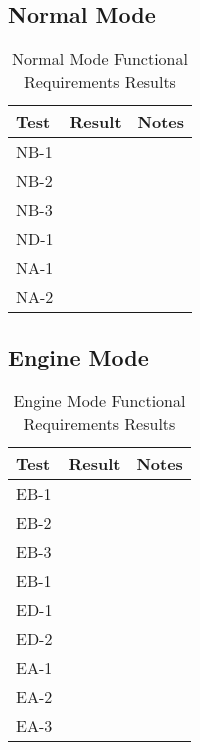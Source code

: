 \documentclass[12pt, titlepage]{article}
\begin{document}
\subsection{Normal Mode}

\begin{table}[H]
  \centering
      \setlength{\leftmargini}{0.4cm}
      \begin{tabular}{| >{\centering\arraybackslash}m{3cm} | 
        >{\centering\arraybackslash}m{4cm} | 
        >{\centering\arraybackslash}m{6cm} |}
      \hline
      \rowcolor[gray]{0.9}
      Test & Result & Notes\\
      \hline
      NB-1 &  & \\
      \hline
      NB-2 &  & \\
      \hline
      NB-3 &  & \\
      \hline
      ND-1 &  & \\
      \hline
      NA-1 &  & \\
      \hline
      NA-2 &  & \\
      \hline
      \end{tabular}
  \caption{Normal Mode Functional Requirements Results}
  \end{table}

\subsection{Engine Mode}

\begin{table}[H]
  \centering
      \setlength{\leftmargini}{0.4cm}
      \begin{tabular}{| >{\centering\arraybackslash}m{3cm} | 
        >{\centering\arraybackslash}m{4cm} | 
        >{\centering\arraybackslash}m{6cm} |}
      \hline
      \rowcolor[gray]{0.9}
      Test & Result & Notes\\
      \hline
      EB-1 &  & \\
      \hline
      EB-2 &  & \\
      \hline
      EB-3 &  & \\
      \hline
      EB-1 &  & \\
      \hline
      ED-1 &  & \\
      \hline
      ED-2 &  & \\
      \hline
      EA-1 &  & \\
      \hline
      EA-2 &  & \\
      \hline
      EA-3 &  & \\
      \hline
      \end{tabular}
  \caption{Engine Mode Functional Requirements Results}
  \end{table}
\end{document}
